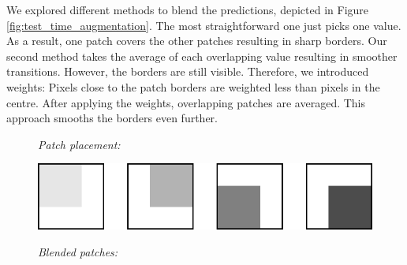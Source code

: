 \documentclass[10pt,conference,compsocconf]{IEEEtran}
\begin{document}
We explored different methods to blend the predictions, depicted in Figure \ref{fig:test_time_augmentation}. The most straightforward one just picks one value. As a result, one patch covers the other patches resulting in sharp borders. Our second method takes the average of each overlapping value resulting in smoother transitions. However, the borders are still visible. Therefore, we introduced weights: Pixels close to the patch borders are weighted less than pixels in the centre. After applying the weights, overlapping patches are averaged. This approach smooths the borders even further.

\begin{figure}[h]
    \textit{Patch placement:}
    
    \vspace{5pt}
    
    \includegraphics[width=.5\columnwidth]{images/patch_locations.png}
    
    \vspace{5pt}
    
    \textit{Blended patches:}
    
    \vspace{5pt}
    

\end{figure}
\end{document}
